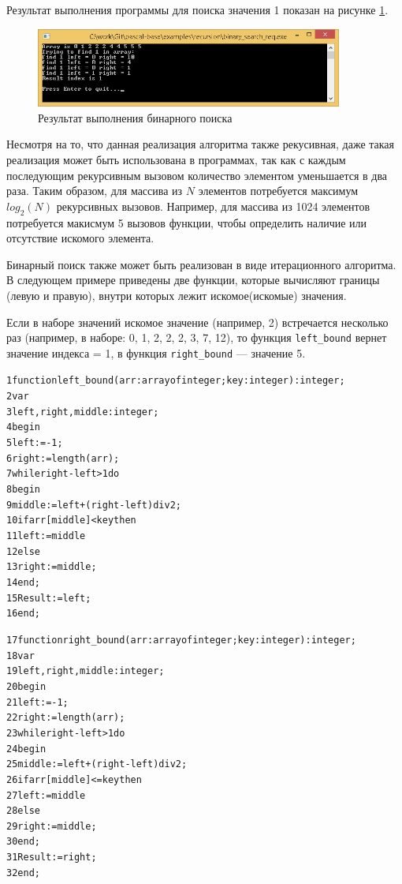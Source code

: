 \documentclass[12pt,a4paper]{article}
\begin{document}
Результат выполнения программы для поиска значения 1 показан на рисунке \ref{pic06}.

\begin{figure}[h!]
	\centering	
	\includegraphics[width=0.9\textwidth]{images/lec14-pic06.png}
	\caption{Результат выполнения бинарного поиска}
	\label{pic06}	
\end{figure}

Несмотря на то, что данная реализация алгоритма также рекусивная, даже такая реализация может быть использована в программах, так как с каждым последующим рекурсивным вызовом количество элементом уменьшается в два раза. Таким образом, для массива из $N$ элементов потребуется максимум $log_2(N)$ рекурсивных вызовов. Например, для массива из 1024 элементов потребуется макисмум 5 вызовов функции, чтобы определить наличие или отсутствие искомого элемента.

Бинарный поиск также может быть реализован в виде итерационного алгоритма. В следующем примере приведены две функции, которые вычисляют границы (левую и правую), внутри которых лежит искомое(искомые) значения.

Если в наборе значений искомое значение (например, 2) встречается несколько раз (например, в наборе: 0, 1, 2, 2, 2, 3, 7, 12), то функция \texttt{left\_bound} вернет значение индекса = 1, в функция \texttt{right\_bound} --- значение 5.

\begin{alltt}
1	function left\_bound(arr: array of integer; key: integer): integer;
2	var
3	  left, right, middle: integer;
4	begin
5	  left := -1;
6	  right := length(arr);
7	  while right - left > 1 do
8	  begin
9	    middle := left + (right - left) div 2;
10	    if arr[middle] < key then
11	      left := middle
12	    else
13	      right := middle;
14	  end;
15	  Result := left;
16	end;

17	function right\_bound(arr: array of integer; key: integer): integer;
18	var
19	  left, right, middle: integer;
20	begin
21	  left := -1;
22	  right := length(arr);
23	  while right - left > 1 do
24	  begin
25	    middle := left + (right - left) div 2; 
26	    if arr[middle] <= key then
27	      left := middle
28	    else
29	      right := middle;
30	  end;
31	  Result := right;
32	end;
\end{alltt}
\end{document}
